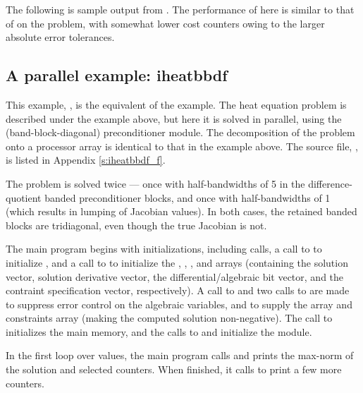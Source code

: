 The following is sample output from .
The performance of {\fida} here is similar to that of {\ida} on
the  problem, with somewhat lower cost counters owing to
the larger absolute error tolerances.



\subsection{A parallel example: iheatbbdf}\label{ss:iheatbbdf}

This example, , is the {\F} equivalent of the 
example.  The heat equation problem is described under the 
example above, but here it is solved in parallel, using the {\idabbdpre}
(band-block-diagonal) preconditioner module.  The decomposition of the
problem onto a processor array is identical to that in the 
example above.  The source file, , is listed in
Appendix \ref{s:iheatbbdf_f}.

The problem is solved twice --- once with half-bandwidths of 5 in the
difference-quotient banded preconditioner blocks, and once with
half-bandwidths of 1 (which results in lumping of Jacobian values).
In both cases, the retained banded blocks are tridiagonal, even though
the true Jacobian is not.

The main program begins with initializations, including {\mpi} calls,
a call to  to initialize {\nvecp}, and a call to
 to initialize the , , , and
 arrays (containing the solution vector, solution derivative vector,
the differential/algebraic bit vector, and the contraint specification
vector, respectively).  A call to  and two calls to
 are made to suppress error control on the algebraic
variables, and to supply the  array and constraints array (making
the computed solution non-negative).  The call to 
initializes the {\fida} main memory, and the calls to 
and  initialize the {\fidabbd} module.

In the first loop over  values, the main program calls 
and prints the max-norm of the solution and selected counters.  When finished,
it calls  to print a few more counters.

